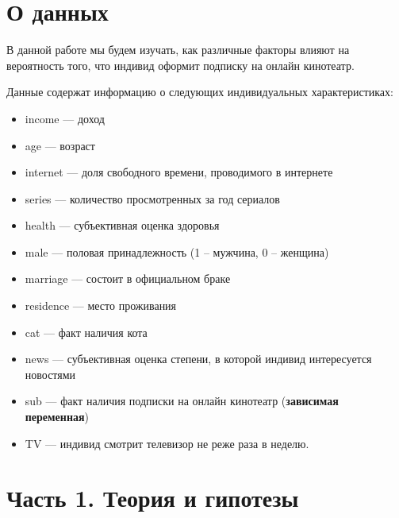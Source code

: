 \documentclass[a4paper,12pt]{article}
\begin{document}
	\newpage
	
	\tableofcontents
	
	\listoftables
	
	
	\section{О данных}
	
	В данной работе мы будем изучать, как различные факторы влияют на вероятность
	того, что индивид оформит подписку на онлайн кинотеатр.
	
	Данные содержат информацию о следующих индивидуальных характеристиках:
	\begin{itemize}
		
		\item income — доход
		
		\item age — возраст
		
		\item internet — доля свободного времени, проводимого в интернете
		
		\item series — количество просмотренных за год сериалов
		
		\item health — субъективная оценка здоровья
		
		\item male — половая принадлежность (1 – мужчина, 0 – женщина)
		
		\item marriage — состоит в официальном браке
		
		\item residence — место проживания
		
		\item cat — факт наличия кота
		
		\item news — субъективная оценка степени, в которой индивид интересуется новостями
		
		\item sub — факт наличия подписки на онлайн кинотеатр (\textbf{зависимая переменная})
		
		\item TV — индивид смотрит телевизор не реже раза в неделю.
		
	\end{itemize}
	 
\newpage	

	\section{Часть 1. Теория и гипотезы}
	
\end{document}
